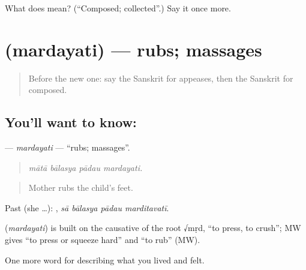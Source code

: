 \begin{tcolorbox}[breakable,colback=teal!4,colframe=teal!35!black,title={Before you move on}]
What does  mean? (\textquotedblleft{}Composed; collected\textquotedblright{}.) Say it once more.
\end{tcolorbox}
\section[\texorpdfstring{\sk{मर्दयति} (mardayati)}{मर्दयति (mardayati)}]{ (mardayati) — rubs; massages}

\label{lesson:SA-C456-mardayati}



\begin{quote}
Before the new one: say the Sanskrit for appeases, then the Sanskrit for composed.
\end{quote}

\subsection*{You'll want to know: }
\textbf{} — \emph{mardayati} — \textquotedblleft{}rubs; massages\textquotedblright{}.

\begin{quote}
   
\end{quote}

\begin{quote}
\emph{mātā bālasya pādau mardayati.}
\end{quote}

\begin{quote}
Mother rubs the child's feet.
\end{quote}

Past (she …):    , \emph{sā bālasya pādau marditavatī}.

\begin{cousinweb}
\textbf{} (\emph{mardayati}) is built on the causative of the root √mṛd, \textquotedblleft{}to press, to crush\textquotedblright{}; MW gives \textquotedblleft{}to press or squeeze hard\textquotedblright{} and \textquotedblleft{}to rub\textquotedblright{} (MW).
\end{cousinweb}

\begin{grammarlens}[title={What you've built}]
One more word for describing what you lived and felt.
\end{grammarlens}

